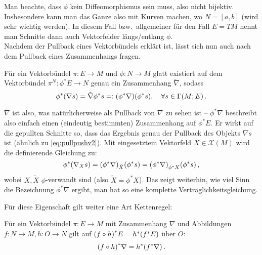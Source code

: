 \documentclass[../H_Analysis_main.tex]{subfiles}
\begin{document}
Man beachte, dass $\phi$ kein Diffeomorphismus sein muss, also nicht bijektiv. Insbesondere kann man das Ganze also mit Kurven machen, wo $N = [a, b]$ (wird sehr wichtig werden). In diesem Fall bzw.~allgemeiner für den Fall $E = TM$ nennt man Schnitte dann auch Vektorfelder längs/entlang $\phi$.\\


Nachdem der Pullback eines Vektorbündels erklärt ist, lässt sich nun auch nach dem Pullback eines Zusammenhangs fragen.

\begin{satz}
Für ein Vektorbündel $\pi: E \rightarrow M$ und $\phi: N \rightarrow M$ glatt existiert auf dem Vektorbündel $\pi^N: \phi^* E \rightarrow N$ genau ein Zusammenhang $\tilde{\nabla}$, sodass
\begin{equation}
\phi^* \qty(\nabla s) = \tilde{\nabla} \phi^* s =: \qty(\phi^* \nabla) \qty(\phi^* s), \quad \forall s \in \Gamma(M; E) \, .
\end{equation}
\end{satz}

$\tilde{\nabla}$ ist also, was natürlicherweise als Pullback von $\nabla$ zu sehen ist -- $\phi^* \nabla$ beschreibt also einfach einen (eindeutig bestimmten) Zusammenhang auf $\phi^* E$. Er wirkt auf die gepullten Schnitte so, dass das Ergebnis genau der Pullback des Objekts $\nabla s$ ist (ähnlich zu \eqref{eq:pullpushv2}). Mit eingesetztem Vektorfeld $X \in \mathcal{X}(M)$ wird die definierende Gleichung zu:
\begin{equation}
\phi^* \qty(\nabla_X s) = \qty(\phi^* \nabla)_{\tilde{X}} \qty(\phi^* s) = \qty(\phi^* \nabla)_{\phi^* X} \qty(\phi^* s) \, ,
\end{equation}
wobei $X, \tilde{X}$ $\phi$-verwandt sind (also $\tilde{X} = \phi^* X$). Das zeigt weiterhin, wie viel Sinn die Bezeichnung $\phi^* \nabla$ ergibt, man hat so eine komplette Verträglichkeitsgleichung.

Für diese Eigenschaft gilt weiter eine Art Kettenregel:
\begin{satz}
Für ein Vektorbündel $\pi: E \rightarrow M$ mit Zusammenhang $\nabla$ und Abbildungen $f: N \rightarrow M, h: O \rightarrow N$ gilt auf $\qty(f \circ h)^* E = h^* \qty(f^* E)$ über $O$:
\begin{equation}
\qty(f \circ h)^* \nabla = h^* \qty(f^* \nabla) \, .
\end{equation}
\end{satz}
\end{document}
